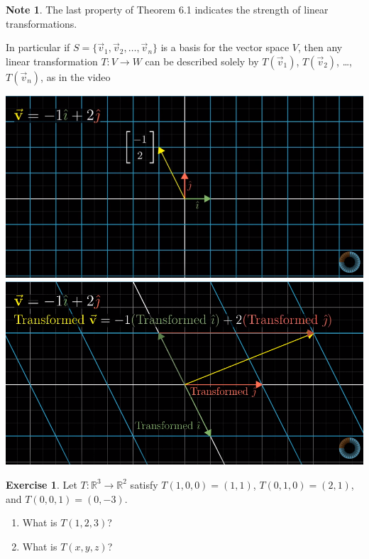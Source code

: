 \documentclass{beamer}
\newcommand{\R}{\mathbb{R}}
\newcommand{\fn}{\insertframenumber}
\theoremstyle{definition}
\newtheorem{exercise}{Exercise}
\newtheorem*{nb}{Note}
\begin{document}
\begin{frame}{\fn}
	\begin{nb}
		The last property of Theorem 6.1 indicates the strength of linear transformations.
		
		In particular if $S=\{\vec v_1,\vec v_2,\dots,\vec v_n\}$ is a basis for the vector space $V$, then any linear transformation $T\colon V\to W$ can be described solely by $T(\vec v_1)$, $T(\vec v_2)$, \dots, $T(\vec v_n)$, as in the video
		\begin{center}
			\includegraphics[width=.4\textwidth]{images/linear_transformation_basis_1}
			\hspace{.25in}
			\includegraphics[width=.4\textwidth]{images/linear_transformation_basis_2}
		\end{center}
	\end{nb}
\end{frame}
\begin{frame}{\fn}
	\begin{exercise}
		Let $T:\R^3\to \R^2$ satisfy $T(1,0,0)=(1,1)$, $T(0,1,0)=(2,1)$, and $T(0,0,1)=(0,-3)$.
		\begin{enumerate}[label=(\alph*)]
			\item What is $T(1,2,3)$?
			\item What is $T(x,y,z)$?
		\end{enumerate}
	\end{exercise}
\end{frame}
\end{document}
